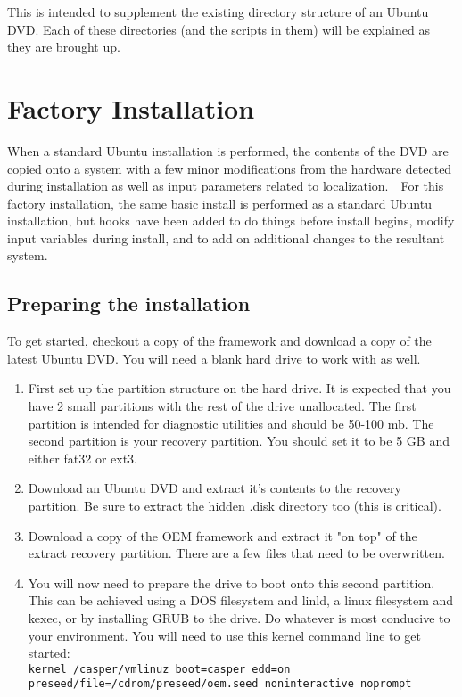 \documentclass[letterpaper,10pt,titlepage]{article}
\begin{document}
This is intended to supplement the existing directory structure of an Ubuntu DVD.  Each of these directories (and the scripts in them) will be explained as they are brought up.

\section{Factory Installation}
When a standard Ubuntu installation is performed, the contents of the DVD are copied onto a system with a few minor modifications from the hardware detected during installation as well as input parameters related to localization.\
\
For this factory installation, the same basic install is performed as a standard Ubuntu installation, but hooks have been added to do things before install begins, modify input variables during install, and to add on additional changes to the resultant system.

\subsection{Preparing the installation}
To get started, checkout a copy of the framework and download a copy of the latest Ubuntu DVD.  You will need a blank hard drive to work with as well.
\begin{enumerate}{}
\item First set up the partition structure on the hard drive.  It is expected that you have 2 small partitions with the rest of the drive unallocated.  The first partition is intended for diagnostic utilities and should be 50-100 mb.  The second partition is your recovery partition.  You should set it to be 5 GB and either fat32 or ext3.
\item Download an Ubuntu DVD and extract it's contents to the recovery partition.  Be sure to extract the hidden .disk directory too (this is critical).
\item Download a copy of the OEM framework and extract it "on top" of the extract recovery partition.  There are a few files that need to be overwritten.
\item You will now need to prepare the drive to boot onto this second partition.  This can be achieved using a DOS filesystem and linld, a linux filesystem and kexec, or by installing GRUB to the drive.  Do whatever is most conducive to your environment.  You will need to use this kernel command line to get started:
\\
\texttt{kernel /casper/vmlinuz boot=casper edd=on preseed/file=/cdrom/preseed/oem.seed noninteractive noprompt}
\end{enumerate}
\end{document}
